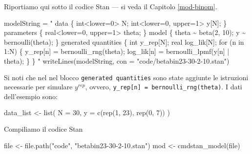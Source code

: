 \documentclass[
  10pt,
  italian,
  a4paper,
  extrafontsizes,onecolumn,openright
  ]{memoir}
\newenvironment{Shaded}{\begin{snugshade}}{\end{snugshade}}
\newcommand{\AttributeTok}[1]{\textcolor[rgb]{0.77,0.63,0.00}{#1}}
\newcommand{\DecValTok}[1]{\textcolor[rgb]{0.00,0.00,0.81}{#1}}
\newcommand{\FunctionTok}[1]{\textcolor[rgb]{0.00,0.00,0.00}{#1}}
\newcommand{\NormalTok}[1]{#1}
\newcommand{\OtherTok}[1]{\textcolor[rgb]{0.56,0.35,0.01}{#1}}
\newcommand{\StringTok}[1]{\textcolor[rgb]{0.31,0.60,0.02}{#1}}
\begin{document}
Riportiamo qui sotto il codice Stan --- si veda il Capitolo \ref{mod-binom}.

\begin{Shaded}
\begin{Highlighting}[]
\NormalTok{modelString }\OtherTok{=} \StringTok{"}
\StringTok{data \{}
\StringTok{  int\textless{}lower=0\textgreater{} N;}
\StringTok{  int\textless{}lower=0, upper=1\textgreater{} y[N];}
\StringTok{\}}
\StringTok{parameters \{}
\StringTok{  real\textless{}lower=0, upper=1\textgreater{} theta;}
\StringTok{\}}
\StringTok{model \{}
\StringTok{  theta \textasciitilde{} beta(2, 10);}
\StringTok{  y \textasciitilde{} bernoulli(theta);}
\StringTok{\}}
\StringTok{generated quantities \{}
\StringTok{  int y\_rep[N];}
\StringTok{  real log\_lik[N];}
\StringTok{  for (n in 1:N) \{}
\StringTok{    y\_rep[n] = bernoulli\_rng(theta);}
\StringTok{    log\_lik[n] = bernoulli\_lpmf(y[n] | theta);}
\StringTok{  \}}
\StringTok{\}}
\StringTok{"}
\FunctionTok{writeLines}\NormalTok{(modelString, }\AttributeTok{con =} \StringTok{"code/betabin23{-}30{-}2{-}10.stan"}\NormalTok{)}
\end{Highlighting}
\end{Shaded}

\noindent
Si noti che nel nel blocco \texttt{generated\ quantities} sono state aggiunte le istruzioni necessarie per simulare \(y^{rep}\), ovvero, \texttt{y\_rep{[}n{]}\ =\ bernoulli\_rng(theta)}. I dati dell'esempio sono:

\begin{Shaded}
\begin{Highlighting}[]
\NormalTok{data\_list }\OtherTok{\textless{}{-}} \FunctionTok{list}\NormalTok{(}
  \AttributeTok{N =} \DecValTok{30}\NormalTok{,}
  \AttributeTok{y =} \FunctionTok{c}\NormalTok{(}\FunctionTok{rep}\NormalTok{(}\DecValTok{1}\NormalTok{, }\DecValTok{23}\NormalTok{), }\FunctionTok{rep}\NormalTok{(}\DecValTok{0}\NormalTok{, }\DecValTok{7}\NormalTok{))}
\NormalTok{)}
\end{Highlighting}
\end{Shaded}

\noindent
Compiliamo il codice Stan

\begin{Shaded}
\begin{Highlighting}[]
\NormalTok{file }\OtherTok{\textless{}{-}} \FunctionTok{file.path}\NormalTok{(}\StringTok{"code"}\NormalTok{, }\StringTok{"betabin23{-}30{-}2{-}10.stan"}\NormalTok{)}
\NormalTok{mod }\OtherTok{\textless{}{-}} \FunctionTok{cmdstan\_model}\NormalTok{(file)}
\end{Highlighting}
\end{Shaded}
\end{document}
